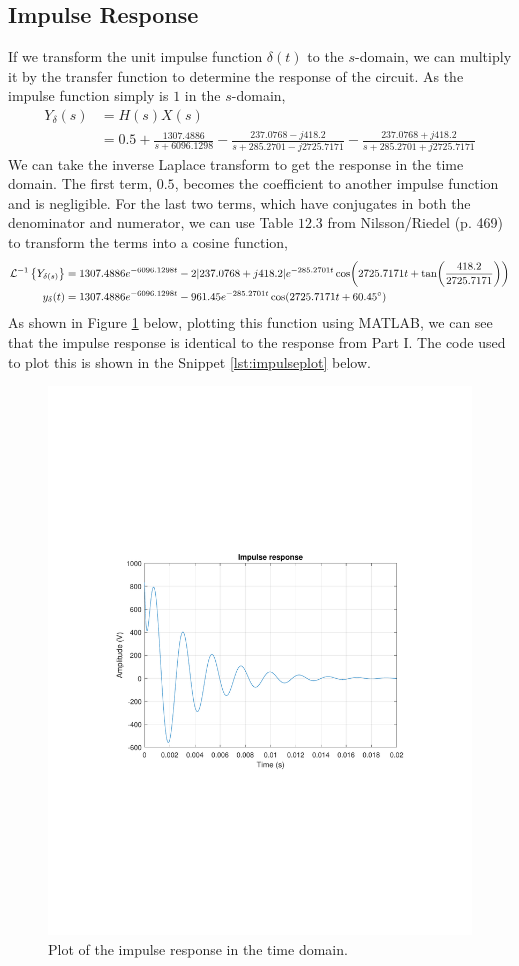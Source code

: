 \documentclass{homework}
\begin{document}
	\subsection{Impulse Response}
	If we transform the unit impulse function $\delta(t)$ to the $s$-domain, we can multiply it by the transfer function to determine the response of the circuit. As the impulse function simply is $1$ in the $s$-domain, \begin{align*}
		Y_\delta(s) & = H(s) X(s) \\
			& = 0.5 + \frac{1307.4886}{s + 6096.1298}
			- \frac{237.0768-j418.2}{s + 285.2701-j2725.7171}
			- \frac{237.0768+j418.2}{s + 285.2701+j2725.7171}
		\end{align*}
	We can take the inverse Laplace transform to get the response in the time domain. The first term, $0.5$, becomes the coefficient to another impulse function and is negligible. For the last two terms, which have conjugates in both the denominator and numerator, we can use Table $12.3$ from Nilsson/Riedel (p. 469) to transform the terms into a cosine function,
	\begin{align*}
		\mathcal{L}^{-1} \left\{ Y_{\delta(s)} \right\} & = 1307.4886 e^{-6096.1298t}
			- 2 \abs{237.0768 + j 418.2} e^{-285.2701 t} \cos(2725.7171 t + \tan(\frac{418.2}{2725.7171})) \\
			y_\delta (t)	& = 1307.4886e^{-6096.1298t} - 961.45 e^{-285.2701t} \cos(2725.7171t + 60.45^\circ)
	\end{align*}
	As shown in Figure \ref{fig:part21impulse} below, plotting this function using MATLAB, we can see that the impulse response is identical to the response from Part I. The code used to plot this is shown in the Snippet \ref{lst:impulseplot} below.
	\begin{figure}[H]
		\centering
		\includegraphics[width=0.65\linewidth,clip,trim=4cm 8.5cm 3cm 8.5cm]{part2_1impulse}
		\caption{Plot of the impulse response in the time domain.}
		\label{fig:part21impulse}
	\end{figure}
\end{document}

